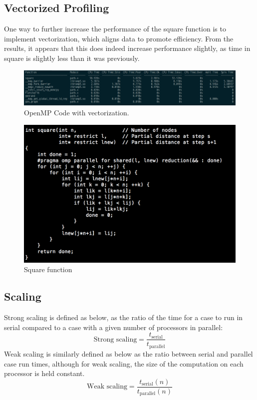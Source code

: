 \documentclass{article}
\begin{document}
\subsection{Vectorized Profiling}

One way to further increase the performance of the square function is to implement vectorization, which aligns data to promote efficiency. From the results, it appears that this does indeed increase performance slightly, as time in square is slightly less than it was previously. 

	\begin{figure}[h!]
		\begin{center}
			\includegraphics[width=.7\columnwidth]{amplxe_vector}
			\caption{OpenMP Code with vectorization.}
			\label{amplxe_vector}
		\end{center}
	\end{figure}
			
	
	\begin{figure}[h!]
		\begin{center}
			\includegraphics[width=0.5\columnwidth]{square}
			\caption{Square function}
			\label{square}
		\end{center}
	\end{figure}

\subsection{Scaling}
Strong scaling is defined as below, as the ratio of the time for a case to run in serial compared to a case with a given number of processors in parallel:
\begin{equation}
\textrm{Strong scaling} = \frac{t_{\textrm{serial}}}{t_{\textrm{parallel}}}
\end{equation}
Weak scaling is similarly defined as below as the ratio between serial and parallel case run times, although for weak scaling, the size of the computation on each processor is held constant. \\
\begin{equation}
\textrm{Weak scaling} = \frac{t_{\textrm{serial}}(n)}{t_{\textrm{parallel}}(n)}
\end{equation}
\end{document}
